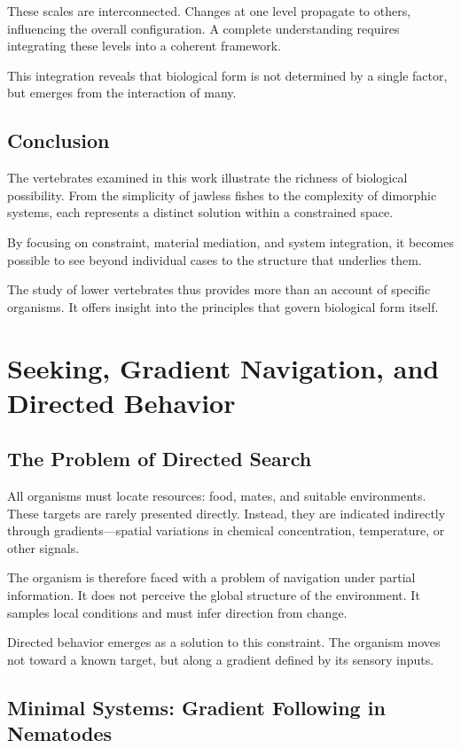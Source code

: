 \documentclass[11pt,oneside]{book}
\begin{document}
These scales are interconnected. Changes at one level propagate to others, influencing the overall configuration. A complete understanding requires integrating these levels into a coherent framework.

This integration reveals that biological form is not determined by a single factor, but emerges from the interaction of many.

\section{Conclusion}

The vertebrates examined in this work illustrate the richness of biological possibility. From the simplicity of jawless fishes to the complexity of dimorphic systems, each represents a distinct solution within a constrained space.

By focusing on constraint, material mediation, and system integration, it becomes possible to see beyond individual cases to the structure that underlies them.

The study of lower vertebrates thus provides more than an account of specific organisms. It offers insight into the principles that govern biological form itself.

\chapter{Seeking, Gradient Navigation, and Directed Behavior}

\section{The Problem of Directed Search}

All organisms must locate resources: food, mates, and suitable environments. These targets are rarely presented directly. Instead, they are indicated indirectly through gradients—spatial variations in chemical concentration, temperature, or other signals.

The organism is therefore faced with a problem of navigation under partial information. It does not perceive the global structure of the environment. It samples local conditions and must infer direction from change.

Directed behavior emerges as a solution to this constraint. The organism moves not toward a known target, but along a gradient defined by its sensory inputs.

\section{Minimal Systems: Gradient Following in Nematodes}
\end{document}
